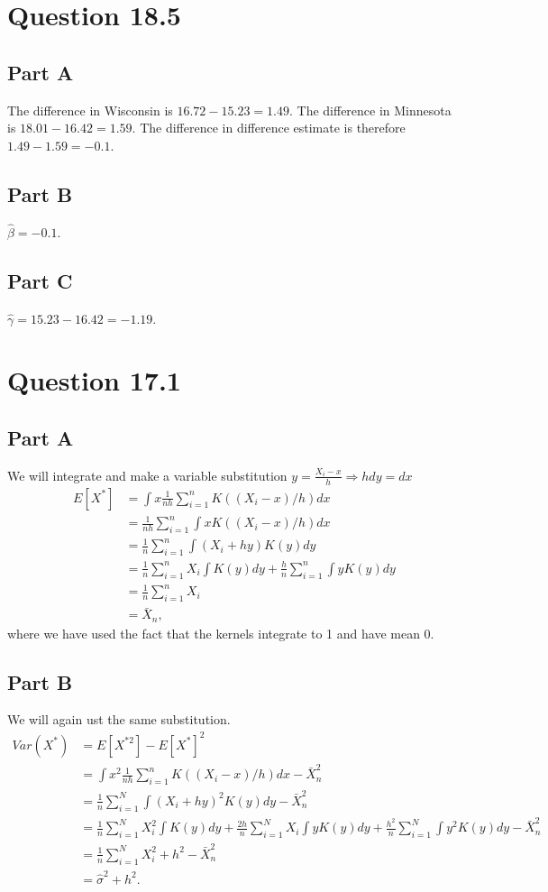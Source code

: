 \documentclass[11pt]{article} %
\begin{document}
\section{Question 18.5}
\subsection{Part A}
The difference in Wisconsin is $16.72 - 15.23 = 1.49$. The difference in Minnesota is $18.01-16.42 = 1.59$. The difference in difference estimate is therefore $1.49 - 1.59 = -0.1$.
\subsection{Part B}
$\hat{\beta} = -0.1$.
\subsection{Part C}
$\hat{\gamma} = 15.23 - 16.42 = -1.19.$

\section{Question 17.1}
\subsection{Part A}
We will integrate and make a variable substitution $y = \frac{X_i - x}{h}\Rightarrow h dy = dx$
\begin{align*}
E[X^*] &= \int x \frac{1}{nh} \sum_{i=1}^n K((X_i - x)/h) dx\\
&= \frac{1}{nh}\sum_{i=1}^n \int x K((X_i - x)/h) dx \\
&= \frac{1}{n}\sum_{i=1}^n \int (X_i + hy) K(y) dy  \\
&= \frac{1}{n}\sum_{i=1}^n X_i \int K(y) dy + \frac{h}{n}\sum_{i=1}^n \int y K(y) dy \\
&= \frac{1}{n}\sum_{i=1}^n X_i \\
&= \bar{X}_n,
\end{align*}
where we have used the fact that the kernels integrate to 1 and have mean 0.
\subsection{Part B}
We will again ust the same substitution.
\begin{align*}
Var(X^*) &= E[X^{*2}] - E[X^*]^2\\
&= \int x^2 \frac{1}{nh} \sum_{i=1}^n K((X_i - x)/h) dx -\bar{X}_n^2 \\
&= \frac{1}{n}\sum_{i=1}^N \int (X_i+hy)^2K(y)dy -\bar{X}_n^2\\
&= \frac{1}{n}\sum_{i=1}^N X_i^2 \int K(y)dy + \frac{2h}{n}\sum_{i=1}^N X_i \int yK(y)dy + \frac{h^2}{n}\sum_{i=1}^N \int y^2K(y)dy -\bar{X}_n^2\\
&= \frac{1}{n}\sum_{i=1}^N X_i^2  + h^2 - \bar{X}_n^2\\
&= \hat{\sigma}^2 + h^2.
\end{align*}
\end{document}
